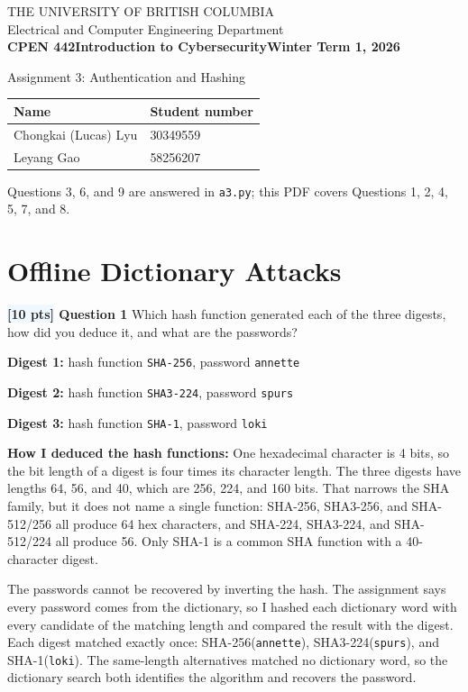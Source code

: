 \documentclass[12pt]{article}
\newcommand{\question}[2]{\textbf{\colorbox{aliceblue}{[#2 pts]} Question #1}}
\begin{document}
\begin{center}
    THE UNIVERSITY OF BRITISH COLUMBIA\\
    Electrical and Computer Engineering Department\\[\baselineskip]
    {\bf CPEN 442\hfill Introduction to Cybersecurity\hfill Winter Term 1, 2026}
    \vspace{1cm}

    {\sc \Large Assignment 3: Authentication and Hashing}
\end{center}

\begin{tabularx}{\textwidth}{|X|l|}
    \hline
    \rowcolor{gray!15} \textbf{Name} & \textbf{Student number} \\
    \hline
    Chongkai (Lucas) Lyu & 30349559 \\
    \hline
    Leyang Gao & 58256207 \\
    \hline
\end{tabularx}

Questions 3, 6, and 9 are answered in \texttt{a3.py}; this PDF covers Questions 1, 2, 4, 5, 7, and 8.

\section{Offline Dictionary Attacks}

\question{1}{10} Which hash function generated each of the three digests, how did you deduce it, and what are the passwords?

\begin{answer}
    \textbf{Digest 1:} hash function \texttt{SHA-256}, password \texttt{annette}

    \textbf{Digest 2:} hash function \texttt{SHA3-224}, password \texttt{spurs}

    \textbf{Digest 3:} hash function \texttt{SHA-1}, password \texttt{loki}

    \textbf{How I deduced the hash functions:}
    One hexadecimal character is 4 bits, so the bit length of a digest is four times its character length.
    The three digests have lengths 64, 56, and 40, which are 256, 224, and 160 bits.
    That narrows the SHA family, but it does not name a single function: SHA-256, SHA3-256, and SHA-512/256 all produce 64 hex characters, and SHA-224, SHA3-224, and SHA-512/224 all produce 56.
    Only SHA-1 is a common SHA function with a 40-character digest.

    The passwords cannot be recovered by inverting the hash.
    The assignment says every password comes from the dictionary, so I hashed each dictionary word with every candidate of the matching length and compared the result with the digest.
    Each digest matched exactly once: SHA-256(\texttt{annette}), SHA3-224(\texttt{spurs}), and SHA-1(\texttt{loki}).
    The same-length alternatives matched no dictionary word, so the dictionary search both identifies the algorithm and recovers the password.
\end{answer}
\end{document}
